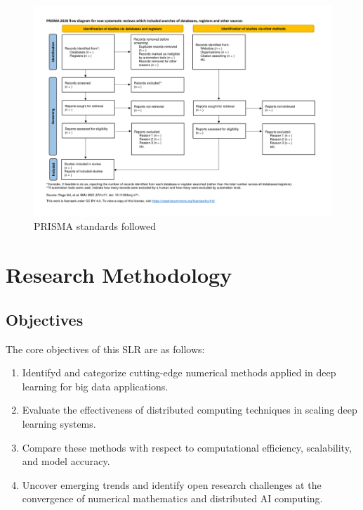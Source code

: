 \documentclass[acmsmall]{acmart}
\begin{document}
\begin{landscape}
    \begin{figure}
        \centering
        \includegraphics[height=0.9\textwidth]{media/flow-diagram.png}
        \caption{PRISMA standards followed}
        \label{fig:prisma-standards}
    \end{figure}
\end{landscape}

\section{Research Methodology}\label{sec:research-methodology}

\subsection{Objectives}\label{subsec:objectives}
The core objectives of this SLR are as follows:

\begin{enumerate}
    \item Identifyd and categorize cutting-edge numerical methods applied in deep learning for big data applications.
    \item Evaluate the effectiveness of distributed computing techniques in scaling deep learning systems.
    \item Compare these methods with respect to computational efficiency, scalability, and model accuracy.
    \item Uncover emerging trends and identify open research challenges at the convergence of numerical mathematics and distributed AI computing.
\end{enumerate}
\end{document}
